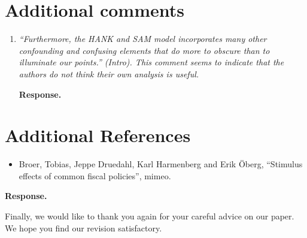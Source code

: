 \documentclass[12pt,letterpaper,english]{article}
\begin{document}
\bigskip
\newpage

\section*{Additional comments}

	\begin{enumerate}[label=(\alph*)]
		\item \textit{``Furthermore, the HANK and SAM model incorporates many other confounding and confusing elements that do more to obscure than to illuminate our points.'' (Intro). This comment seems to indicate that the authors do not think their own analysis is useful.}
		
		\noindent \textbf{Response.} 
	\end{enumerate}

\bigskip

\section*{Additional References}
	
	\begin{itemize}
		\item Broer, Tobias, Jeppe Druedahl, Karl Harmenberg and Erik \"Oberg, ``Stimulus effects of common fiscal policies'', mimeo. 
	\end{itemize}

	\noindent \textbf{Response.} 

\bigskip

\noindent Finally, we would like to thank you again for your careful advice on our paper. We hope you find our revision satisfactory.



\end{document}
